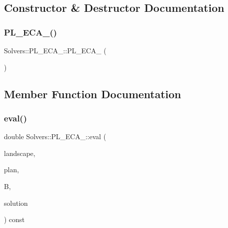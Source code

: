 \subsection{Constructor \& Destructor Documentation}
\mbox{\label{class_solvers_1_1_p_l___e_c_a__2_adcc16b55e0d26128fe508bc3f282c29a}} 
\subsubsection{\texorpdfstring{P\+L\+\_\+\+E\+C\+A\+\_()}{PL\_ECA\_2()}}
{\footnotesize\ttfamily Solvers\+::\+P\+L\+\_\+\+E\+C\+A\+\_\+::\+P\+L\+\_\+\+E\+C\+A\+\_ (\begin{DoxyParamCaption}{ }\end{DoxyParamCaption})\hspace{0.3cm}{\ttfamily [inline]}}



\subsection{Member Function Documentation}
\mbox{\label{class_solvers_1_1_p_l___e_c_a__2_acc94c4cef3ea294af20215ae2ec77711}} 
\subsubsection{\texorpdfstring{eval()}{eval()}}
{\footnotesize\ttfamily double Solvers\+::\+P\+L\+\_\+\+E\+C\+A\+\_\+::eval (\begin{DoxyParamCaption}\item[{const \hyperlink{class_landscape}{Landscape} \&}]{landscape,  }\item[{const \hyperlink{class_restoration_plan}{Restoration\+Plan} \&}]{plan,  }\item[{const double}]{B,  }\item[{const \hyperlink{class_solution}{Solution} \&}]{solution }\end{DoxyParamCaption}) const}

